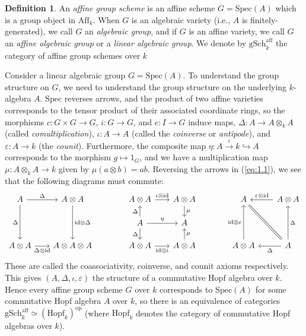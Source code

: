 \documentclass[10pt]{amsart}
\numberwithin{equation}{section}
\def\To#1{\xrightarrow{#1}}
\newcommand{\ve}{\varepsilon}
\newcommand{\mono}{\hookrightarrow}
\newcommand{\Spec}{\mathrm{Spec}}
\newcommand{\id}{\mathrm{id}}
\newcommand{\op}{\mathrm{op}}
\newcommand{\aff}{\mathrm{aff}}
\newcommand{\Hopf}{\mathrm{Hopf}}
\newcommand{\gSch}{\mathrm{gSch}}
\newcommand{\Aff}{\mathrm{Aff}}
\theoremstyle{plain}
\theoremstyle{definition}
\newtheorem{defn}[thm]{Definition}
\theoremstyle{remark}
\begin{document}
\begin{defn}
    An \emph{affine group scheme} is an affine scheme $G = \Spec(A)$ which is a group object in $\Aff_k$. When $G$ is an algebraic variety (i.e., $A$ is finitely-generated), we call $G$ an \emph{algebraic group}, and if $G$ is an affine variety, we call $G$ an \emph{affine algebraic group} or a \emph{linear algebraic group}. We denote by $\gSch_k^\aff$ the category of affine group schemes over $k$ 
\end{defn}
Consider a linear algebraic group $G = \Spec(A)$. To understand the group structure on $G$, we need to understand the group structure on the underlying $k$-algebra $A$. $\Spec$ reverses arrows, and the product of two affine varieties corresponds to the tensor product of their associated coordinate rings, so the morphisms  $c: G \times G \to G$, $i: G \to G$, and $e: I \to G$ induce maps, $\Delta: A \to A \otimes_k A$ (called \emph{comultiplication}), $\iota: A \to A$ (called the \emph{coinverse} or \emph{antipode}), and $\ve: A \to k$ (the \emph{counit}). Furthermore, the composite map $\eta: A \To{\ve} k \mono A$ corresponds to the morphism $g \mapsto 1_G$, and we have a multiplication map $\mu: A \otimes_k A \to k$ given by $\mu(a \otimes b) = ab$. Reversing the arrows in (\ref{eq:1.1}), we see that the following diagrams must commute:
\begin{equation}\label{eq:1.2}\begin{tikzcd}[sep = scriptsize]
    A & {A \otimes A} && {A \otimes A} & {A \otimes A} && A & {A \otimes A} \\
    &&& A & A \\
    {A \otimes A} & {A \otimes A \otimes A} && {A \otimes A} & {A \otimes A} && {A \otimes A} & A
    \arrow["\Delta", from=1-1, to=1-2]
    \arrow["\Delta"', from=1-1, to=3-1]
    \arrow["{\id \otimes \Delta}", from=1-2, to=3-2]
    \arrow["{\iota \otimes \id}", from=1-4, to=1-5]
    \arrow["\mu", from=1-5, to=2-5]
    \arrow["{\ve \otimes \id}"', from=1-8, to=1-7]
    \arrow["\Delta", from=2-4, to=1-4]
    \arrow["\eta", from=2-4, to=2-5]
    \arrow["\Delta"', from=2-4, to=3-4]
    \arrow["{\Delta \otimes \id}"', from=3-1, to=3-2]
    \arrow["{\id \otimes \iota}"', from=3-4, to=3-5]
    \arrow["\mu"', from=3-5, to=2-5]
    \arrow["{\id \otimes \ve}", from=3-7, to=1-7]
    \arrow[equals, from=3-8, to=1-7]
    \arrow["\Delta"', from=3-8, to=1-8]
    \arrow["\Delta", from=3-8, to=3-7]
\end{tikzcd}\end{equation}
These are called the coassociativity, coinverse, and counit axioms respectively. This gives $(A, \Delta, \iota, \ve)$ the structure of a commutative Hopf algebra over $k$. Hence every affine group scheme $G$ over $k$ corresponds to $\Spec(A)$ for some commutative Hopf algebra $A$ over $k$, so there is an equivalence of categories $\gSch_k^\aff \simeq \left(\Hopf_k\right)^\op$ (where $\Hopf_k$ denotes the category of commutative Hopf algebras over $k$).
\end{document}
